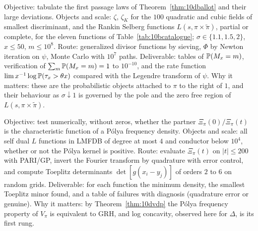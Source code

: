 \begin{compproblem}
Objective: tabulate the first passage laws of Theorem~\ref{thm:10dballot} and their large deviations. Objects and scale: $\zeta$, $\zeta_K$ for the $100$ quadratic and cubic fields of smallest discriminant, and the Rankin Selberg functions $L(s,\pi\times\tilde\pi)$, partial or complete, for the eleven functions of Table~\ref{tab:10bcatalogue}; $\sigma\in\{1.1,1.5,2\}$, $x\le50$, $m\le10^8$. Route: generalized divisor functions by sieving, $\Phi$ by Newton iteration on $\psi$, Monte Carlo with $10^7$ paths. Deliverable: tables of $\mathbb{P}(M_x = m)$, verification of $\sum_m\mathbb{P}(M_x=m) = 1$ to $10^{-10}$, and the rate function $\lim x^{-1}\log\mathbb{P}(\tau_x>\theta x)$ compared with the Legendre transform of $\psi$. Why it matters: these are the probabilistic objects attached to $\pi$ to the right of $1$, and their behaviour as $\sigma\downarrow1$ is governed by the pole and the zero free region of $L(s,\pi\times\tilde\pi)$.
\end{compproblem}

\begin{compproblem}
Objective: test numerically, without zeros, whether the partner $\Xi_\pi(0)/\Xi_\pi(t)$ is the characteristic function of a P\'olya frequency density. Objects and scale: all self dual $L$ functions in LMFDB of degree at most $4$ and conductor below $10^4$, whether or not the P\'olya kernel is positive. Route: evaluate $\Xi_\pi(t)$ on $|t|\le200$ with PARI/GP, invert the Fourier transform by quadrature with error control, and compute Toeplitz determinants $\det[g(x_i-y_j)]$ of orders $2$ to $6$ on random grids. Deliverable: for each function the minimum density, the smallest Toeplitz minor found, and a table of failures with diagnosis (quadrature error or genuine). Why it matters: by Theorem~\ref{thm:10dvdp} the P\'olya frequency property of $V_\pi$ is equivalent to GRH, and log concavity, observed here for $\Delta$, is its first rung.
\end{compproblem}
